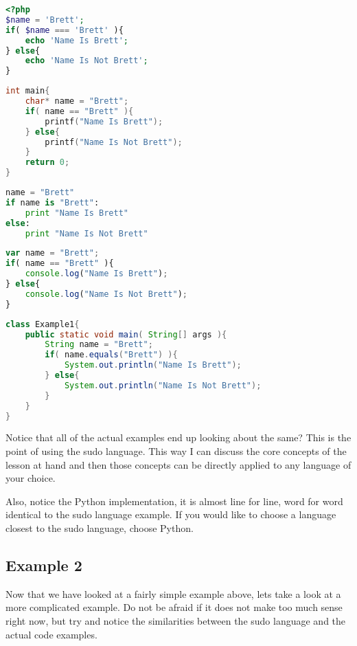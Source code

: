 \begin{lstlisting}[language=php,caption={Example 1 - PHP}]
<?php
$name = 'Brett';
if( $name === 'Brett' ){
    echo 'Name Is Brett';
} else{
    echo 'Name Is Not Brett';
}
\end{lstlisting}

\begin{lstlisting}[language=c,caption={Example 1 - C}]
int main{
    char* name = "Brett";
    if( name == "Brett" ){
        printf("Name Is Brett");
    } else{
        printf("Name Is Not Brett");
    }
    return 0;
}
\end{lstlisting}

\begin{lstlisting}[language=python,caption={Example 1 - Python}]
name = "Brett"
if name is "Brett":
    print "Name Is Brett"
else:
    print "Name Is Not Brett"
\end{lstlisting}

\begin{lstlisting}[language=javascript,caption={Example 1 - Node.JS}]
var name = "Brett";
if( name == "Brett" ){
    console.log("Name Is Brett");
} else{
    console.log("Name Is Not Brett");
}
\end{lstlisting}

\begin{lstlisting}[language=java,caption={Example 1 - Java}]
class Example1{
    public static void main( String[] args ){
        String name = "Brett";
        if( name.equals("Brett") ){
            System.out.println("Name Is Brett");
        } else{
            System.out.println("Name Is Not Brett");
        }
    }
}
\end{lstlisting}

Notice that all of the actual examples end up looking about the same? This is the point of using the sudo language. This way I can discuss the core concepts of the lesson at hand and then those concepts can be directly applied to any language of your choice.
\par

Also, notice the Python implementation, it is almost line for line, word for word identical to the sudo language example. If you would like to choose a language closest to the sudo language, choose Python.

\subsection{Example 2}
Now that we have looked at a fairly simple example above, lets take a look at a more complicated example.
Do not be afraid if it does not make too much sense right now, but try and notice the similarities
between the sudo language and the actual code examples.



